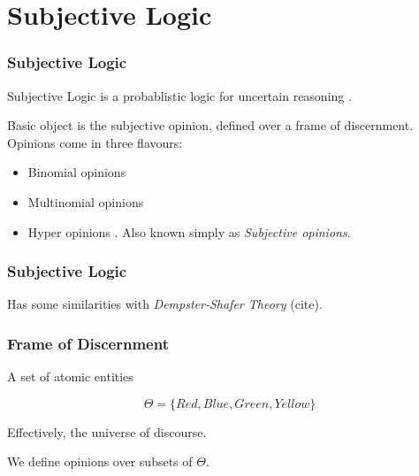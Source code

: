 \documentclass{beamer}
\begin{document}
%
%

\section{Subjective Logic}

\begin{frame}
\frametitle{Subjective Logic}

Subjective Logic is a probablistic logic for uncertain reasoning
\cite{josang_logic_2001}.

Basic object is the subjective opinion, defined over a frame of discernment.
Opinions come in three flavours:

\begin{itemize}
  \item Binomial opinions
  \item Multinomial opinions
  \item Hyper opinions \cite{josang2012interpretation}. Also known simply as
    \emph{Subjective opinions}.
\end{itemize}

\end{frame}


\begin{frame}
\frametitle{Subjective Logic}

Has some similarities with \emph{Dempster-Shafer Theory} (cite).


\end{frame}


\begin{frame}
\frametitle{Frame of Discernment}

A set of atomic entities

$$\Theta = \lbrace Red, Blue, Green, Yellow \rbrace$$

Effectively, the universe of discourse.

We define opinions over subsets of $\Theta$.

\end{frame}

\end{document}
